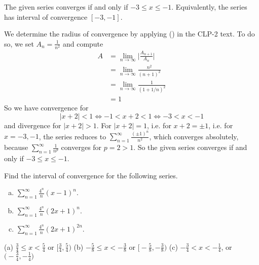 
\begin{answer}
The given series converges if and only if  $-3\le x\le -1$.
Equivalently, the series has interval of convergence $[-3,-1]$.
\end{answer}

\begin{solution}
We determine the radius of convergence by applying () in the CLP-2 text. To do so, 
we set $A_n= \frac{1}{n^2}$ and compute
\begin{align*}
A &= \lim_{n\to\infty} \bigg| \frac{A_{n+1}}{A_n}\bigg| \\
&=\lim_{n\rightarrow\infty}\frac{n^2}{{(n+1)}^2}  \\
&=\lim_{n\rightarrow\infty}\frac{1}{{(1+1/n)}^2} \\
&=1
\end{align*}
So we have convergence for
\begin{equation*}
|x+2|<1
\iff -1<x+2<1
\iff -3<x<-1
\end{equation*}
and divergence for $|x+2|>1$. For $|x+2|=1$, i.e. for $x+2=\pm 1$,
i.e. for $x=-3,-1$, the series reduces to
$\sum\limits_{n=1}^\infty\frac{(\pm 1)^n}{n^2}$, which converges absolutely,
because $\sum\limits_{n=1}^\infty\frac{1}{n^p}$ converges for $p=2>1$.
So the given series converges if and only if  $-3\le x\le -1$.
\end{solution}

\begin{question}[2016Q6]
Find the interval of convergence for the following series.
\begin{enumerate}[(a)]
\item
$\displaystyle \sum_{n=1}^\infty \frac{4^n}{n}(x-1)^n$.
\item
$\displaystyle \sum_{n=1}^\infty \frac{4^n}{n}(2x+1)^n$.
\item
$\displaystyle \sum_{n=1}^\infty \frac{4^n}{n}(2x+1)^{2n}$.
\end{enumerate}
\end{question}


\begin{answer}
(a) $\frac{3}{4}\le x<\frac{5}{4}$ or $\big[\frac{3}{4},\frac{5}{4}\big)$\qquad
(b) $-\frac{5}{8}\le x<-\frac{3}{8}$ or $\big[-\frac{5}{8},-\frac{3}{8}\big)$\qquad
(c) $-\frac{3}{4}< x<-\frac{1}{4}$, or $\big(-\frac{3}{4},-\frac{1}{4}\big)$
\end{answer}

